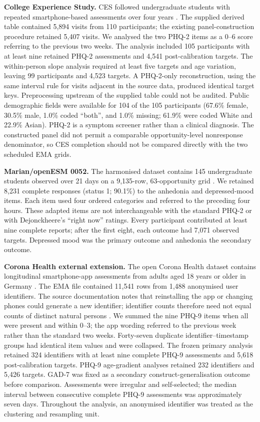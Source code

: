 \documentclass[pdflatex,sn-vancouver-num]{sn-jnl}
\begin{document}
\textbf{College Experience Study.} CES followed undergraduate students with repeated smartphone-based assessments over four years \cite{ref11}. The supplied derived table contained 5,894 visits from 110 participants; the existing panel-construction procedure retained 5,407 visits. We analysed the two PHQ-2 items as a 0--6 score referring to the previous two weeks. The analysis included 105 participants with at least nine retained PHQ-2 assessments and 4,541 post-calibration targets. The within-person slope analysis required at least five targets and age variation, leaving 99 participants and 4,523 targets. A PHQ-2-only reconstruction, using the same interval rule for visits adjacent in the source data, produced identical target keys. Preprocessing upstream of the supplied table could not be audited. Public demographic fields were available for 104 of the 105 participants (67.6\% female, 30.5\% male, 1.0\% coded ``both'', and 1.0\% missing; 61.9\% were coded White and 22.9\% Asian). PHQ-2 is a symptom screener rather than a clinical diagnosis. The constructed panel did not permit a comparable opportunity-level nonresponse denominator, so CES completion should not be compared directly with the two scheduled EMA grids.

\textbf{Marian/openESM 0052.} The harmonised dataset contains 145 undergraduate students observed over 21 days on a 9,135-row, 63-opportunity grid \cite{ref12,ref17,ref22}. We retained 8,231 complete responses (status 1; 90.1\%) to the anhedonia and depressed-mood items. Each item used four ordered categories and referred to the preceding four hours. These adapted items are not interchangeable with the standard PHQ-2 or with Dejonckheere's ``right now'' ratings. Every participant contributed at least nine complete reports; after the first eight, each outcome had 7,071 observed targets. Depressed mood was the primary outcome and anhedonia the secondary outcome.

\textbf{Corona Health external extension.} The open Corona Health dataset contains longitudinal smartphone-app assessments from adults aged 18 years or older in Germany \cite{ref24,ref28}. The EMA file contained 11,541 rows from 1,488 anonymised user identifiers. The source documentation notes that reinstalling the app or changing phones could generate a new identifier; identifier counts therefore need not equal counts of distinct natural persons \cite{ref28}. We summed the nine PHQ-9 items when all were present and within 0--3; the app wording referred to the previous week rather than the standard two weeks. Forty-seven duplicate identifier--timestamp groups had identical item values and were collapsed. The frozen primary analysis retained 324 identifiers with at least nine complete PHQ-9 assessments and 5,618 post-calibration targets. PHQ-9 age-gradient analyses retained 232 identifiers and 5,426 targets. GAD-7 was fixed as a secondary construct-generalisation outcome before comparison. Assessments were irregular and self-selected; the median interval between consecutive complete PHQ-9 assessments was approximately seven days. Throughout the analysis, an anonymised identifier was treated as the clustering and resampling unit.
\end{document}
